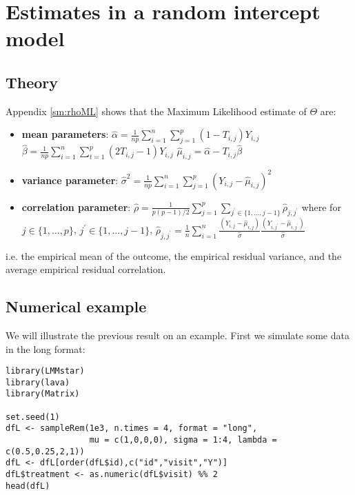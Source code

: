 \documentclass[12pt]{article}
\begin{document}
\clearpage

\section{Estimates in a random intercept model}
\label{sec:orgb6bde5d}

\subsection{Theory}
\label{sec:org992d230}

Appendix \ref{sm:rhoML} shows that the Maximum Likelihood estimate of \(\Theta\) are:
\begin{itemize}
\item \textbf{mean parameters}: \(\widehat{\alpha}= \frac{1}{np} \sum_{i=1}^n
  \sum_{j=1}^p (1-T_{i,j}) Y_{i,j}\) \newline
{} \(\widehat{\beta}=
  \frac{1}{np} \sum_{i=1}^n \sum_{t=1}^p (2 T_{i,j}-1) Y_{i,j}\) \newline
{} \(\widehat{\mu}_{i,j} = \widehat{\alpha} - T_{i,j}\widehat{\beta}\)
\item \textbf{variance parameter}: \(\widehat{\sigma}^2 =
  \frac{1}{np}\sum_{i=1}^n\sum_{j=1}^p (Y_{i,j}-\widehat{\mu}_{i,j})^2\)
\item \textbf{correlation parameter}: \(\widehat{\rho} =
  \frac{1}{p(p-1)/2}\sum_{j=1}^p \sum_{j^{\prime} \in
  \{1,\ldots,j-1\}}\widehat{\rho}_{j,j^{\prime}}\) \newline where for
\(j \in \{1,\ldots,p\}\), \(j^{\prime} \in \{1,\ldots,j-1\}\),
\(\widehat{\rho}_{j,j^{\prime}} = \frac{1}{n}\sum_{i=1}^n
  \frac{(Y_{i,j}-\widehat{\mu}_{i,j})}{\widehat{\sigma}}\frac{(Y_{i,j^{\prime}}-\widehat{\mu}_{i,j^{\prime}})}{\widehat{\sigma}}\)
\end{itemize}
i.e. the empirical mean of the outcome, the empirical residual
variance, and the average empirical residual correlation.

\subsection{Numerical example}
\label{sec:orgabefcad}

We will illustrate the previous result on an example. First we
simulate some data in the long format:
\lstset{language=r,label= ,caption= ,captionpos=b,numbers=none}
\begin{lstlisting}
library(LMMstar)
library(lava)
library(Matrix)

set.seed(1)
dfL <- sampleRem(1e3, n.times = 4, format = "long",
                 mu = c(1,0,0,0), sigma = 1:4, lambda = c(0.5,0.25,2,1))
dfL <- dfL[order(dfL$id),c("id","visit","Y")]
dfL$treatment <- as.numeric(dfL$visit) %% 2
head(dfL)
\end{lstlisting}
\end{document}
